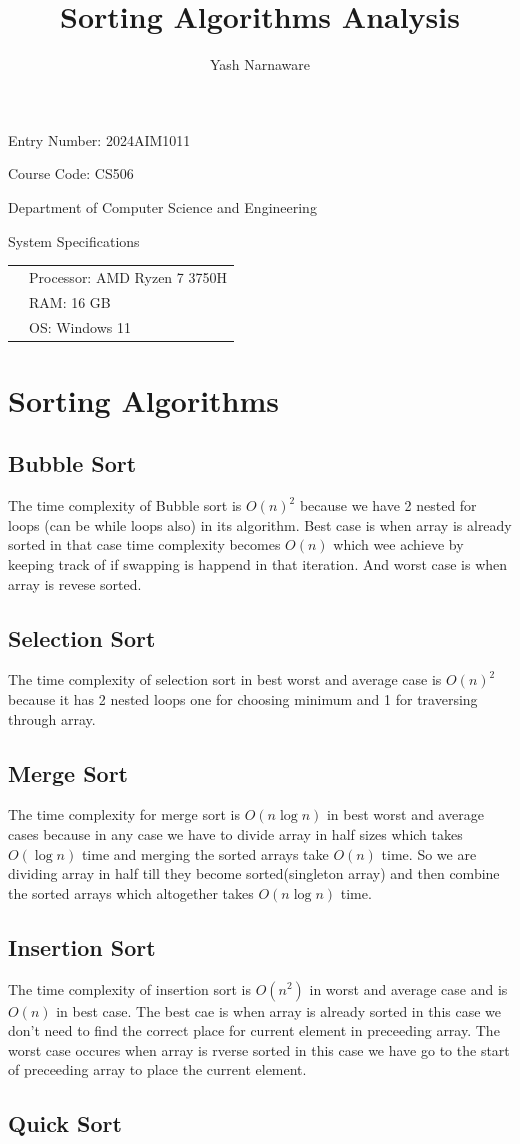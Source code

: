 \documentclass{report}
\author{Yash Narnaware}
\title{Sorting Algorithms Analysis}
\makeatletter
\renewcommand{\maketitle}{
    \begin{titlepage}
        \centering
        \vspace*{2cm}

        {\Huge \bfseries \@title \par}
        \vspace{1.5cm}
        {\Huge \@author \par}
        
        { Entry Number: 2024AIM1011 \par}
        \vspace{0 cm}
        {Course Code: CS506 \par}
        {\Large Department of Computer Science and Engineering \par}
        \vspace{2cm}
        
        {\Large System Specifications \par}
        \begin{center}
            \begin{tabular}{rl}
                &Processor:  AMD Ryzen 7 3750H \\
                &RAM:  16 GB \\
                &OS: Windows 11 \\
            \end{tabular}
        \end{center}
        
        \vfill
    \end{titlepage}
}
\makeatother
\begin{document}
\maketitle

\renewcommand{\arraystretch}{0.6}


\setlength{\tabcolsep}{2pt}

\chapter{Sorting Algorithms}


\section{Bubble Sort}
The time complexity of Bubble sort is $O(n)^{2}$ because we have 2 nested for loops (can be while loops also) in its algorithm. Best case is when array is already sorted in that case time complexity becomes $O(n)$ which wee achieve by keeping track of if swapping is happend in that iteration. And worst case is when array is revese sorted.
\section{Selection Sort}
The time complexity of selection sort in best worst and average case is $O(n)^{2}$ because it has 2 nested loops one for choosing minimum and 1 for traversing through array.
\section{Merge Sort}
The time complexity for merge sort is $O(n\log{n})$ in best worst and average cases because in any case we have to divide array in half sizes which takes $O(\log{n})$ time and merging the sorted arrays take $O(n)$ time. So we are dividing array in half till they become sorted(singleton array) and then combine the sorted arrays which altogether takes $O(n\log{n})$ time.
\section{Insertion Sort}
The time complexity of insertion sort is $O(n^2)$ in worst and average case and is $O(n)$ in best case. The best cae is when array is already sorted in this case we don't need to find the correct place for current element in preceeding array. The worst case occures when array is rverse sorted in this case we have go to the start of preceeding array to place the current element.
\section{Quick Sort}
\end{document}
